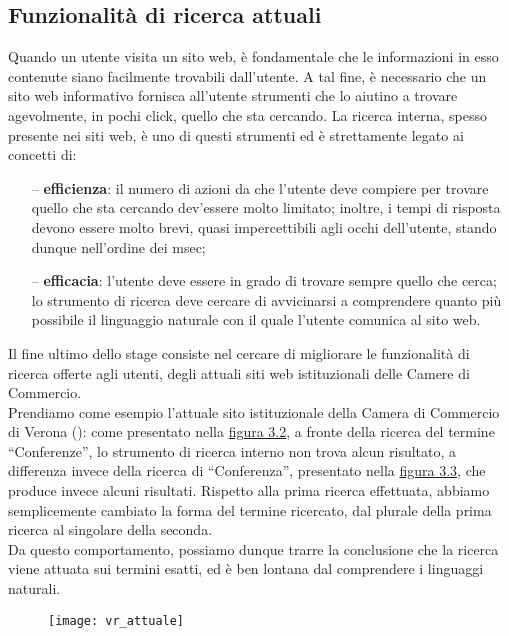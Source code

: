 		\subsection{Funzionalità di ricerca attuali}
		Quando un utente visita un sito web, è fondamentale che le informazioni in esso contenute siano facilmente trovabili dall'utente.
		A tal fine, è necessario che un sito web informativo fornisca all'utente strumenti che lo aiutino a trovare agevolmente, in pochi click, quello che sta cercando. La ricerca interna, spesso presente nei siti web, è uno di questi strumenti ed è strettamente legato ai concetti di:
		\begin{itemize}
			\item[--]{\textbf{efficienza}: il numero di azioni da che l'utente deve compiere per trovare quello che sta cercando dev'essere molto limitato; inoltre, i tempi di risposta devono essere molto brevi, quasi impercettibili agli occhi dell'utente, stando dunque nell’ordine dei msec;}
			\item[--]{\textbf{efficacia}: l’utente deve essere in grado di trovare sempre quello che cerca; lo strumento di ricerca deve cercare di avvicinarsi a comprendere quanto più possibile il linguaggio naturale con il quale l'utente comunica al sito web.}
		\end{itemize}
		
		Il fine ultimo dello stage consiste nel cercare di migliorare le funzionalità di ricerca offerte agli utenti, degli attuali siti web istituzionali delle Camere di Commercio. \\
		Prendiamo come esempio l’attuale sito istituzionale della Camera di Commercio di Verona (\cite{site:vr_camerale}): come presentato nella \hyperref[img:conferenze]{figura 3.2}, a fronte della ricerca del termine “Conferenze”, lo strumento di ricerca interno non trova alcun risultato, a differenza invece della ricerca di “Conferenza”, presentato nella \hyperref[img:conferenza]{figura 3.3}, che produce invece alcuni risultati. Rispetto alla prima ricerca effettuata, abbiamo semplicemente cambiato la forma del termine ricercato, dal plurale della prima ricerca al singolare della seconda. \\ 
		Da questo comportamento, possiamo dunque trarre la conclusione che la ricerca viene attuata sui termini esatti, ed è ben lontana dal comprendere i linguaggi naturali.

		\begin{figure}[htbp]
			\label{img:conferenze}
			\begin{center}
				\texttt{[image: vr\_attuale]}
			\end{center}
		\end{figure}
	
